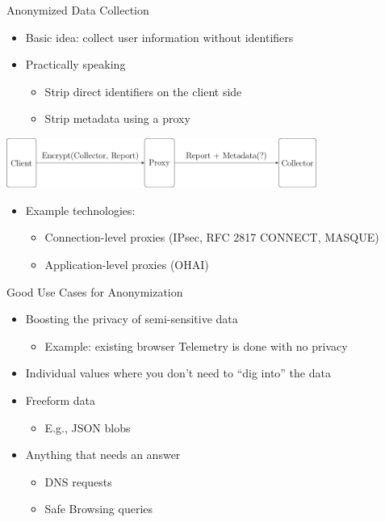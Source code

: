 \documentclass[helvetica]{beamer}
\begin{document}
\begin{frame}{Anonymized Data Collection}

  \begin{itemize}
  \item Basic idea: collect user information without identifiers
  \item Practically speaking    
    \begin{itemize}
    \item Strip direct identifiers on the client side
    \item Strip metadata using a proxy
    \end{itemize}    
  \end{itemize}

  \vspace{2ex}
  \includegraphics[width=4in]{anonymizing-proxy}
  \vspace{2ex}
  
  \begin{itemize}
  \item Example technologies:
    \begin{itemize}
    \item Connection-level proxies (IPsec, RFC 2817 CONNECT, MASQUE)
    \item Application-level proxies (OHAI)      
    \end{itemize}
  \end{itemize}
\end{frame}


\begin{frame}{Good Use Cases for Anonymization}

  \begin{itemize}
  \item Boosting the privacy of semi-sensitive data
    \begin{itemize}
    \item Example: existing browser Telemetry is done with no privacy
    \end{itemize}

  \item Individual values where you don't need to ``dig into'' the data
    
  \item Freeform data
    \begin{itemize}
    \item E.g., JSON blobs
    \end{itemize}

  \item Anything that needs an answer
    \begin{itemize}
    \item DNS requests
    \item Safe Browsing queries
    \end{itemize}
  \end{itemize}
\end{frame}
\end{document}
